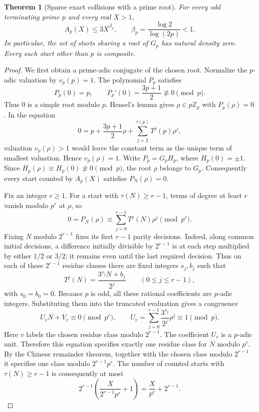 \documentclass[11pt,a4paper]{article}
\newtheorem{theorem}{Theorem}[section]
\theoremstyle{definition}
\theoremstyle{remark}
\numberwithin{equation}{section}
\begin{document}
\begin{theorem}[Sparse exact collisions with a prime root]
For every odd terminating prime $p$ and every real $X>1$,
\[
 \boxed{\quad A_p(X)\le 3X^{\beta_p},\qquad
          \beta_p=\frac{\log2}{\log(2p)}<1.\quad}
\]
In particular, the set of starts sharing a root of $G_p$ has natural
density zero.  Every such start other than $p$ is composite.
\end{theorem}

\begin{proof}
We first obtain a prime-adic conjugate of the chosen root.  Normalize
the $p$-adic valuation by $v_p(p)=1$.  The polynomial $P_p$ satisfies
\[
 P_p(0)=p,\qquad P_p'(0)=\frac{3p+1}{2}\not\equiv0\pmod p.
\]
Thus $0$ is a simple root modulo $p$.  Hensel's lemma gives
$\rho\in p\mathbb Z_p$ with $P_p(\rho)=0$.
In the equation
\[
 0=p+\frac{3p+1}{2}\rho+
               \sum_{j=2}^{\tau(p)}T^j(p)\rho^j,
\]
valuation $v_p(\rho)>1$ would leave the constant term as the unique
term of smallest valuation.  Hence $v_p(\rho)=1$.
Write $P_p=G_pH_p$, where $H_p(0)=\pm1$.  Since
$H_p(\rho)\equiv H_p(0)\not\equiv0\pmod p$, the root $\rho$ belongs
to $G_p$.  Consequently every start counted by $A_p(X)$ satisfies
$P_N(\rho)=0$.

Fix an integer $r\ge1$.  For a start with $\tau(N)\ge r-1$, terms of
degree at least $r$ vanish modulo $p^r$ at $\rho$, so
\[
 0=P_N(\rho)\equiv\sum_{j=0}^{r-1}T^j(N)\rho^j\pmod {p^r}.
\]
Fixing $N$ modulo $2^{r-1}$ fixes its first $r-1$ parity decisions.
Indeed, along common initial decisions, a difference initially divisible
by $2^{r-1}$ is at each step multiplied by either $1/2$ or $3/2$;
it remains even until the last required decision.
Thus on each of these $2^{r-1}$ residue classes there are fixed integers
$s_j,b_j$ such that
\[
 T^j(N)=\frac{3^{s_j}N+b_j}{2^j}
             \qquad(0\le j\le r-1),
\]
with $s_0=b_0=0$.  Because $p$ is odd, all these rational coefficients
are $p$-adic integers.  Substituting them into the truncated evaluation
gives a congruence
\[
 U_vN+V_v\equiv0\pmod {p^r},\qquad
 U_v=\sum_{j=0}^{r-1}\frac{3^{s_j}}{2^j}\rho^j
                        \equiv1\pmod p.
\]
Here $v$ labels the chosen residue class modulo $2^{r-1}$.
The coefficient $U_v$ is a $p$-adic unit.  Therefore this equation
specifies exactly one residue class for $N$ modulo $p^r$.
By the Chinese remainder theorem, together with the chosen class modulo
$2^{r-1}$ it specifies one class modulo $2^{r-1}p^r$.
The number of counted starts with $\tau(N)\ge r-1$ is consequently at
most
\[
 2^{r-1}\left(\frac{X}{2^{r-1}p^r}+1\right)
       =\frac{X}{p^r}+2^{r-1}.
\]


\end{proof}
\end{document}
